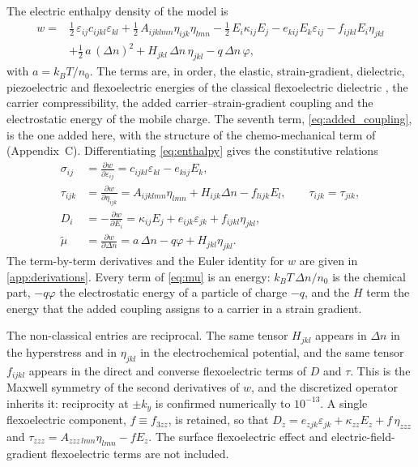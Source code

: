 The electric enthalpy density of the model is
\begin{equation}
\label{eq:enthalpy}
\begin{aligned}
w={}&\tfrac12\,\varepsilon_{ij}c_{ijkl}\varepsilon_{kl}
+\tfrac12\,A_{ijklmn}\eta_{ijk}\eta_{lmn}
-\tfrac12\,E_i\kappa_{ij}E_j
-e_{kij}E_k\varepsilon_{ij}
-f_{ijkl}E_i\eta_{jkl}\\
&+\tfrac12\,a\,(\Delta n)^2
+H_{jkl}\,\Delta n\,\eta_{jkl}
-q\,\Delta n\,\varphi ,
\end{aligned}
\end{equation}
with $a=k_BT/n_0$.  The terms are, in order, the elastic, strain-gradient, dielectric, piezoelectric and flexoelectric energies of the classical flexoelectric dielectric \cite{shen2010theory}, the carrier compressibility, the added carrier--strain-gradient coupling and the electrostatic energy of the mobile charge.  The seventh term, \eqref{eq:added_coupling}, is the one added here, with the structure of the chemo-mechanical term of \cite{qu2025thermodynamic} (Appendix~C).  Differentiating \eqref{eq:enthalpy} gives the constitutive relations
\begin{align}
\sigma_{ij}&=\frac{\partial w}{\partial\varepsilon_{ij}}
=c_{ijkl}\varepsilon_{kl}-e_{kij}E_k,
\label{eq:sigma}\\
\tau_{ijk}&=\frac{\partial w}{\partial\eta_{ijk}}
=A_{ijklmn}\eta_{lmn}+H_{ijk}\Delta n-f_{lijk}E_l,
\qquad \tau_{ijk}=\tau_{jik},
\label{eq:tau}\\
D_i&=-\frac{\partial w}{\partial E_i}
=\kappa_{ij}E_j+e_{ijk}\varepsilon_{jk}+f_{ijkl}\eta_{jkl},
\label{eq:D}\\
\widetilde\mu&=\frac{\partial w}{\partial\Delta n}
=a\,\Delta n-q\varphi+H_{jkl}\eta_{jkl}.
\label{eq:mu}
\end{align}
The term-by-term derivatives and the Euler identity for $w$ are given in \cref{app:derivations}.  Every term of \eqref{eq:mu} is an energy: $k_BT\,\Delta n/n_0$ is the chemical part, $-q\varphi$ the electrostatic energy of a particle of charge $-q$, and the $H$ term the energy that the added coupling assigns to a carrier in a strain gradient.

The non-classical entries are reciprocal.  The same tensor $H_{jkl}$ appears in $\Delta n$ in the hyperstress and in $\eta_{jkl}$ in the electrochemical potential, and the same tensor $f_{ijkl}$ appears in the direct and converse flexoelectric terms of $D$ and $\tau$.  This is the Maxwell symmetry of the second derivatives of $w$, and the discretized operator inherits it: reciprocity at $\pm k_y$ is confirmed numerically to $10^{-13}$.  A single flexoelectric component, $f\equiv f_{3zz}$, is retained, so that $D_z=e_{zjk}\varepsilon_{jk}+\kappa_{zz}E_z+f\,\eta_{zzz}$ and $\tau_{zzz}=A_{zzz\,lmn}\eta_{lmn}-fE_z$.  The surface flexoelectric effect \cite{shen2010theory} and electric-field-gradient flexoelectric terms are not included.

